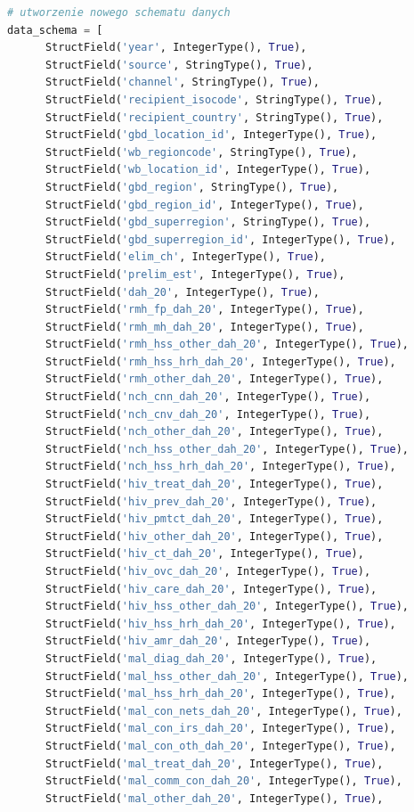 \documentclass[11pt]{report}
\begin{document}
\begin{lstlisting}[language=Python]
# utworzenie nowego schematu danych
data_schema = [
      StructField('year', IntegerType(), True),
      StructField('source', StringType(), True),
      StructField('channel', StringType(), True),
      StructField('recipient_isocode', StringType(), True),
      StructField('recipient_country', StringType(), True),
      StructField('gbd_location_id', IntegerType(), True),
      StructField('wb_regioncode', StringType(), True),
      StructField('wb_location_id', IntegerType(), True),
      StructField('gbd_region', StringType(), True),
      StructField('gbd_region_id', IntegerType(), True),
      StructField('gbd_superregion', StringType(), True),
      StructField('gbd_superregion_id', IntegerType(), True),
      StructField('elim_ch', IntegerType(), True),
      StructField('prelim_est', IntegerType(), True),
      StructField('dah_20', IntegerType(), True),
      StructField('rmh_fp_dah_20', IntegerType(), True),
      StructField('rmh_mh_dah_20', IntegerType(), True),
      StructField('rmh_hss_other_dah_20', IntegerType(), True),
      StructField('rmh_hss_hrh_dah_20', IntegerType(), True),
      StructField('rmh_other_dah_20', IntegerType(), True),
      StructField('nch_cnn_dah_20', IntegerType(), True),
      StructField('nch_cnv_dah_20', IntegerType(), True),
      StructField('nch_other_dah_20', IntegerType(), True),
      StructField('nch_hss_other_dah_20', IntegerType(), True),
      StructField('nch_hss_hrh_dah_20', IntegerType(), True),
      StructField('hiv_treat_dah_20', IntegerType(), True),
      StructField('hiv_prev_dah_20', IntegerType(), True),
      StructField('hiv_pmtct_dah_20', IntegerType(), True),
      StructField('hiv_other_dah_20', IntegerType(), True),
      StructField('hiv_ct_dah_20', IntegerType(), True),
      StructField('hiv_ovc_dah_20', IntegerType(), True),
      StructField('hiv_care_dah_20', IntegerType(), True),
      StructField('hiv_hss_other_dah_20', IntegerType(), True),
      StructField('hiv_hss_hrh_dah_20', IntegerType(), True),
      StructField('hiv_amr_dah_20', IntegerType(), True),
      StructField('mal_diag_dah_20', IntegerType(), True),
      StructField('mal_hss_other_dah_20', IntegerType(), True),
      StructField('mal_hss_hrh_dah_20', IntegerType(), True),
      StructField('mal_con_nets_dah_20', IntegerType(), True),
      StructField('mal_con_irs_dah_20', IntegerType(), True),
      StructField('mal_con_oth_dah_20', IntegerType(), True),
      StructField('mal_treat_dah_20', IntegerType(), True),
      StructField('mal_comm_con_dah_20', IntegerType(), True),
      StructField('mal_other_dah_20', IntegerType(), True),

\end{lstlisting}
\end{document}
